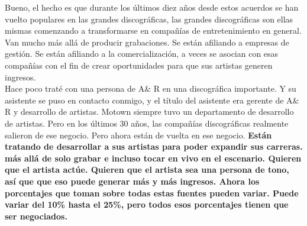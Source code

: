 \documentclass[10pt]{book}
\begin{document}
Bueno, el hecho es que durante los últimos diez años desde estos acuerdos se han vuelto populares en las grandes discográficas, las grandes discográficas son ellas mismas comenzando a transformarse en compañías de entretenimiento en general. Van mucho más allá de producir grabaciones. Se están afiliando a empresas de gestión. Se están afiliando a la comercialización, a veces se asocian con esas compañías con el fin de crear oportunidades para que sus artistas generen ingresos.\\
Hace poco traté con una persona de A\& R en una discográfica importante. Y su asistente se puso en contacto conmigo, y el título del asistente era gerente de A\& R y desarrollo de artistas. Motown siempre tuvo un departamento de desarrollo de artistas. Pero en los últimos 30 años, las compañías discográficas realmente salieron de ese negocio. Pero ahora están de vuelta en ese negocio. \textbf{Están tratando de desarrollar a sus artistas para poder expandir sus carreras. más allá de solo grabar e incluso tocar en vivo en el escenario. Quieren que el artista actúe. Quieren que el artista sea una persona de tono, así que que eso puede generar más y más ingresos. Ahora los porcentajes que toman sobre todas estas fuentes pueden variar. Puede variar del 10\% hasta el 25\%, pero todos esos porcentajes tienen que ser negociados.}
\end{document}
